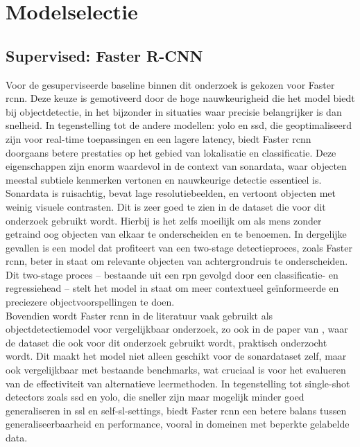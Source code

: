 \section{Modelselectie}

\subsection{Supervised: Faster R-CNN}

Voor de gesuperviseerde baseline binnen dit onderzoek is gekozen voor Faster \gls{rcnn}. Deze keuze is gemotiveerd door de hoge nauwkeurigheid die het model biedt bij objectdetectie, in het bijzonder in situaties waar precisie belangrijker is dan snelheid. In tegenstelling tot de andere modellen: \gls{yolo} en \gls{ssd}, die geoptimaliseerd zijn voor real-time toepassingen en een lagere latency, biedt Faster \gls{rcnn} doorgaans betere prestaties op het gebied van lokalisatie en classificatie. Deze eigenschappen zijn enorm waardevol in de context van sonardata, waar objecten meestal subtiele kenmerken vertonen en nauwkeurige detectie essentieel is. \\

Sonardata is ruisachtig, bevat lage resolutiebeelden, en vertoont objecten met weinig visuele contrasten. Dit is zeer goed te zien in de dataset die voor dit onderzoek gebruikt wordt. Hierbij is het zelfs moeilijk om als mens zonder getraind oog objecten van elkaar te onderscheiden en te benoemen. In dergelijke gevallen is een model dat profiteert van een two-stage detectieproces, zoals Faster \gls{rcnn}, beter in staat om relevante objecten van achtergrondruis te onderscheiden. Dit two-stage proces -- bestaande uit een \gls{rpn} gevolgd door een classificatie- en regressiehead -- stelt het model in staat om meer contextueel geïnformeerde en preciezere objectvoorspellingen te doen. \\

Bovendien wordt Faster \gls{rcnn} in de literatuur vaak gebruikt als objectdetectiemodel voor vergelijkbaar onderzoek, zo ook in de paper van \textcite{Xie_2022}, waar de dataset die ook voor dit onderzoek gebruikt wordt, praktisch onderzocht wordt. Dit maakt het model niet alleen geschikt voor de sonardataset zelf, maar ook vergelijkbaar met bestaande benchmarks, wat cruciaal is voor het evalueren van de effectiviteit van alternatieve leermethoden. In tegenstelling tot single-shot detectors zoals \gls{ssd} en \gls{yolo}, die sneller zijn maar mogelijk minder goed generaliseren in \gls{ssl} en \gls{self-sl}-settings, biedt Faster \gls{rcnn} een betere balans tussen generaliseerbaarheid en performance, vooral in domeinen met beperkte gelabelde data. \\

